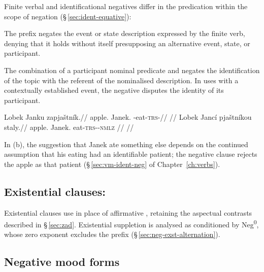Finite verbal and identificational negatives differ in the predication
within the scope of negation (§\,\ref{sec:ident-equative}):

\begin{description}[leftmargin=2em, labelwidth=!, labelindent=0em]
\item[\upshape Finite verbal negation (\ird{za-}).] The prefix  negates
  the event or state description expressed by the finite verb, denying that
  it holds without itself presupposing an alternative event, state, or
  participant.
\item[\upshape Identificational negation (\ird{staly} + participant nominal).]
  The combination of a participant nominal predicate and  negates the
  identification of the topic with the referent of the nominalised description.
  In uses with a contextually established event, the negative disputes the
  identity of its participant.
\end{description}

\pex
\a
\begingl
\gla Lobek Janku zapjaštník.//
\glb apple.\Dir{} Janek.\Trs{} \Neg{}-eat-\textsc{trs}-\Pf{}//
\glft {}
      //
\endgl
\a
\begingl
\gla Lobek Jancí pjaštníkou staly.//
\glb apple.\Dir{} Janek.\Ind{} eat-\textsc{trs}-\Pf{}-\textsc{nmlz} \Neg{}//
\glft {}
      //
\endgl
\xe

\noindent In (b), the suggestion that Janek ate something else depends on
the continued assumption that his eating had an identifiable patient; the
negative clause rejects the apple as that patient
(§\,\ref{sec:vm-ident-neg} of Chapter~\ref{ch:verbs}).

\subsection{Existential clauses: }

Existential clauses use  in place of affirmative , retaining
the aspectual contrasts described in §\,\ref{sec:zad}. Existential suppletion
is analysed as conditioned by Neg\textsuperscript{0}, whose zero exponent
excludes the prefix  (§\,\ref{sec:neg-exst-alternation}).

\subsection{Negative mood forms}

